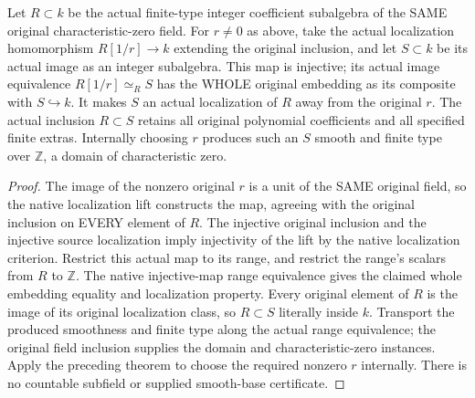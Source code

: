 \begin{definition}
\label{def:arithmetic-actual-localized-coefficient-ring}
\leanok
{}
Let $R\subset k$ be the actual finite-type integer coefficient subalgebra
of the SAME original characteristic-zero field. For $r\ne0$ as above, take
the actual localization homomorphism $R[1/r]\to k$ extending the original
inclusion, and let $S\subset k$ be its actual image as an integer subalgebra.
This map is injective; its actual image equivalence
$R[1/r]\simeq_R S$ has the WHOLE original embedding as its composite with
$S\hookrightarrow k$. It makes $S$ an actual localization of $R$ away from
the original $r$. The actual inclusion $R\subset S$ retains all original
polynomial coefficients and all specified finite extras. Internally choosing
$r$ produces such an $S$ smooth and finite type over $\mathbb Z$, a domain
of characteristic zero.
\end{definition}
\begin{proof}
The image of the nonzero original $r$ is a unit of the SAME original field,
so the native localization lift constructs the map, agreeing with the
original inclusion on EVERY element of $R$. The injective original
inclusion and the injective source localization imply injectivity of the
lift by the native localization criterion. Restrict this actual map to its
range, and restrict the range's scalars from $R$ to $\mathbb Z$. The native
injective-map range equivalence gives the claimed whole embedding equality
and localization property. Every original element of $R$ is the image of
its original localization class, so $R\subset S$ literally inside $k$.
Transport the produced smoothness and finite type along the actual range
equivalence; the original field inclusion supplies the domain and
characteristic-zero instances. Apply the preceding theorem to choose the
required nonzero $r$ internally. There is no countable subfield or supplied
smooth-base certificate.
\end{proof}

